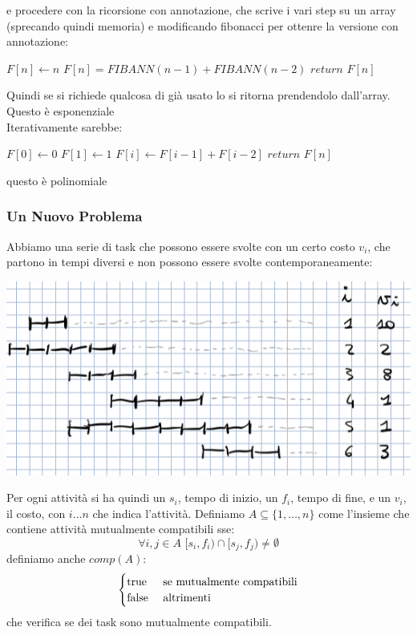 \documentclass[a4paper,12pt, oneside]{book}
\begin{document}
e procedere con la ricorsione con annotazione, che scrive i vari step
su un array (sprecando quindi memoria) e modificando fibonacci per
ottenre la versione con annotazione:
\begin{shaded}
  \begin{algorithmic}
    \State $F[n]\gets n$
    \Else
    \State $F[n]=FIBANN(n-1)+FIBANN(n-2)$
    \EndIf
    \State $return\,\,F[n]$
    \EndIf
    \EndFunction
  \end{algorithmic}
\end{shaded}
Quindi se si richiede qualcosa di già usato lo si ritorna prendendolo
dall'array. Questo è esponenziale\\
Iterativamente sarebbe:
\begin{shaded}
  \begin{algorithmic}
    \State $F[0] \gets 0$
    \State $F[1] \gets 1$
    \State $F[i] \gets F[i-1]+F[i-2]$
    \EndFor
    \State $return\,\,F[n]$
    \EndFunction
  \end{algorithmic}
\end{shaded}
questo è polinomiale
\subsubsection{Un Nuovo Problema}
Abbiamo una serie di task che possono essere svolte con un certo costo
$v_i$, che partono in tempi diversi e non possono essere svolte
contemporaneamente:
\begin{center}
  \includegraphics[scale = 0.7]{img/ta.png}
\end{center}
Per ogni attività si ha quindi un $s_i$, tempo di inizio, un $f_i$,
tempo di fine, e un $v_i$, il costo, con $i\ldots n$ che indica
l'attività. Definiamo $A\subseteq\{1,\ldots, n\}$ come l'insieme che
contiene attività mutualmente compatibili sse:
\[\forall i,j\in A\,\, [s_i,f_i)\cap [s_j,f_j)\neq \emptyset\]
definiamo anche $comp(A)$:
\[
  \begin{cases}
    $true$ & \mbox{ se mutualmente compatibili}\\
    $false$ & \mbox{ altrimenti}
  \end{cases}
\]
che verifica se dei task sono mutualmente compatibili.\\
\end{document}
